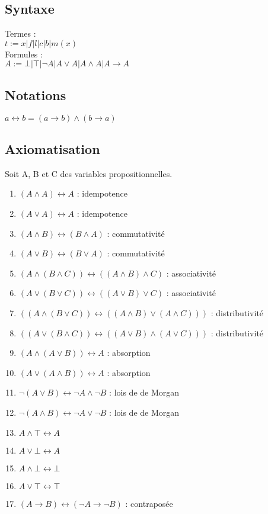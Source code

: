 \documentclass{article}
\begin{document}
\subsection{Syntaxe}
Termes : \\
$t := x|f|l|c|b|m(x)$ \\
Formules : \\
$A := \bot|\top|\neg A|A\vee A|A\wedge A|A \rightarrow A$

\subsection{Notations}
$ a \leftrightarrow b = (a \rightarrow b) \wedge  (b \rightarrow a)$



\subsection{Axiomatisation}
Soit A, B et C des variables propositionnelles.
\begin{enumerate}
  \item $ (A \wedge A) \leftrightarrow  A$ : idempotence
  \item $ (A \vee A) \leftrightarrow  A$ : idempotence
  \item $ (A \wedge B) \leftrightarrow  (B \wedge A)$ : commutativité
  \item $ (A \vee B) \leftrightarrow  (B \vee A)$ : commutativité
  \item $ (A \wedge (B \wedge C)) \leftrightarrow  ((A \wedge B) \wedge C)$ : associativité
  \item $ (A \vee (B \vee C)) \leftrightarrow  ((A \vee B) \vee C)$ : associativité
  \item $ ((A \wedge (B \vee C)) \leftrightarrow ((A \wedge B) \vee (A \wedge C)))$ : distributivité
  \item $ ((A \vee (B \wedge C)) \leftrightarrow ((A \vee B) \wedge (A \vee C))) $ : distributivité
  \item $ (A \wedge (A \vee B)) \leftrightarrow  A$ : absorption
  \item $ (A \vee (A \wedge B)) \leftrightarrow  A$ : absorption
  \item $ \neg (A \vee B) \leftrightarrow \neg A \wedge \neg B$ : lois de de Morgan
  \item $ \neg (A \wedge B) \leftrightarrow \neg A \vee \neg B$ : lois de de Morgan
  \item $ A \wedge \top \leftrightarrow A$
  \item $ A \vee \bot \leftrightarrow A$
  \item $ A \wedge \bot \leftrightarrow \bot$
  \item $ A \vee \top \leftrightarrow \top$
  \item $ (A \rightarrow B) \leftrightarrow (\neg A \rightarrow \neg B)$ : contraposée
\end{enumerate}
\newpage
\end{document}
